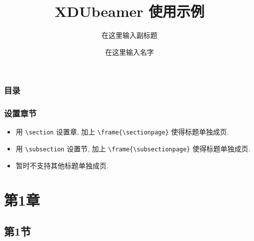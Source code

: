 \documentclass{ctexbeamer}
\title{XDUbeamer 使用示例}
\subtitle{在这里输入副标题}
\institute{在这里输入学院}
\author{在这里输入名字}
\begin{document}
\begin{frame}[plain] %
    \titlepage
\end{frame}
\begin{frame}
    \frametitle{目录}
    \tableofcontents
\end{frame}
\begin{frame}[fragile] %
    \frametitle{设置章节}
    \begin{itemize}
        \item 用 \verb|\section| 设置章, 加上 \verb|\frame{\sectionpage}| 使得标题单独成页.
        \item 用 \verb|\subsection| 设置节, 加上 \verb|\frame{\subsectionpage}| 使得标题单独成页.
        \item 暂时不支持其他标题单独成页.
    \end{itemize}
\end{frame}
\section{第1章}
\frame{\sectionpage}
\subsection{第1节}
\frame{\subsectionpage}
\end{document}
